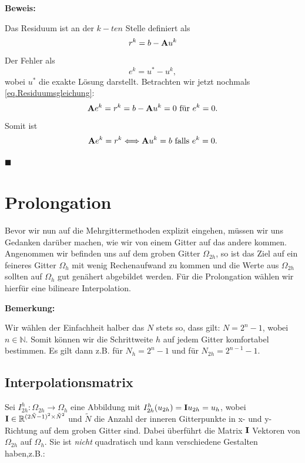 \textbf{Beweis:}

Das Residuum ist an der $k-ten$ Stelle definiert als 
\begin{equation}
r^{k} = b - {\textbf{A}}u^{k}
\end{equation}
Der Fehler als
\begin{equation}
e^{k} = u^{*} - u^{k},
\end{equation}
wobei $u^{*}$ die exakte Lösung darstellt.
Betrachten wir jetzt nochmals \autoref{eq.Residuumsgleichung}:
\begin{equation}
{\textbf{A}}e^{k} = r^{k} = b - {\textbf{A}}u^{k} = 0 \textnormal{ für } e^{k} = 0.
\end{equation}
Somit ist
\begin{equation}
{\textbf{A}}e^{k} = r^{k} \Longleftrightarrow {\textbf{A}}u^{k} = b \textnormal{ falls } e^{k} = 0.
\end{equation}
\begin{flushright}
$\blacksquare$
\end{flushright}

\section{Prolongation}

Bevor wir nun auf die Mehrgittermethoden explizit eingehen, müssen wir uns Gedanken darüber machen, wie wir von einem Gitter auf das andere kommen. Angenommen wir befinden uns auf dem groben Gitter $\Omega_{2h}$, so ist das Ziel auf ein feineres Gitter $\Omega_{h}$ mit wenig Rechenaufwand zu kommen und die Werte aus $\Omega_{2h}$ sollten auf $\Omega_{h}$ gut genähert abgebildet werden. Für die Prolongation wählen wir hierfür eine bilineare Interpolation.


\textbf{Bemerkung:}

Wir wählen der Einfachheit halber das $N$ stets so, dass gilt: $N = 2^{n} - 1$, wobei $n \in \mathbb{N}$. Somit können wir die Schrittweite $h$ auf jedem Gitter komfortabel bestimmen. Es gilt dann z.B. für $N_{h} = 2^{n} - 1$ und für $N_{2h} = 2^{n-1} - 1$.

\subsection{Interpolationsmatrix}

Sei $I^{h}_{2h}: \Omega_{2h} \longrightarrow \Omega_{h}$ eine Abbildung mit $I_{2h}^{h}(u_{2h}) = {\textbf{I}}u_{2h} = u_{h}$, wobei ${\textbf{I}} \in \mathbb{R}^{(2 \tilde N - 1)^{2} \times \tilde N^{2}}$ und $\tilde N$ die Anzahl der inneren Gitterpunkte in x- und y-Richtung auf dem groben Gitter sind. Dabei überführt die Matrix ${\textbf{I}}$ Vektoren von $\Omega_{2h}$ auf $\Omega_{h}$. Sie ist \textit{nicht} quadratisch und kann verschiedene Gestalten haben,z.B.:

